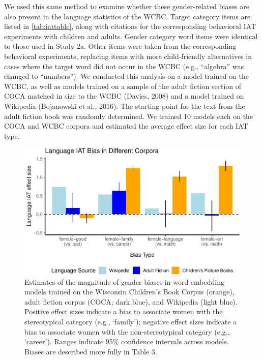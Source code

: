 \documentclass[
  english,
  ,man,floatsintext]{apa6}
\begin{document}
We used this same method to examine whether these gender-related biases are also present in the language statistics of the WCBC. Target category items are listed in \autoref{tab:iattable}, along with citations for the corresponding behavioral IAT experiments with children and adults. Gender category word items were identical to those used in Study 2a. Other items were taken from the corresponding behavioral experiments, replacing items with more child-friendly alternatives in cases where the target word did not occur in the WCBC (e.g., \enquote{algebra} was changed to \enquote{numbers}). We conducted this analysis on a model trained on the WCBC, as well as models trained on a sample of the adult fiction section of COCA matched in size to the WCBC (Davies, 2008) and a model trained on Wikipedia (Bojanowski et al., 2016). The starting point for the text from the adult fiction book was randomly determined. We trained 10 models each on the COCA and WCBC corpora and estimated the average effect size for each IAT type.

\begin{figure}[t!]
\includegraphics[width=\textwidth,]{kidbookgender_psych_sci_files/figure-latex/languageiat-1} \caption{Estimates of the magnitude of gender biases in word embedding models trained on the Wisconsin Children’s Book Corpus (orange), adult fiction corpus (COCA; dark blue), and Wikipedia (light blue). Positive effect sizes indicate a bias to associate women with the stereotypical category (e.g., ‘family'); negative effect sizes indicate a bias to associate women with the non-stereotypical category (e.g., ‘career’).  Ranges indicate 95\% confidence intervals across models. Biases are described more fully in Table 3.}\label{fig:languageiat}
\end{figure}
\end{document}
